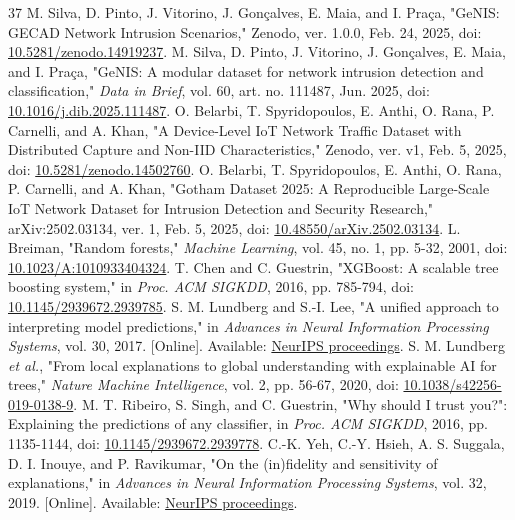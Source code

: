 \documentclass[conference,letterpaper]{IEEEtran}
\begin{document}
\begin{thebibliography}{37}
 M. Silva, D. Pinto, J. Vitorino, J. Gonçalves, E. Maia, and I. Praça, "GeNIS: GECAD Network Intrusion Scenarios," Zenodo, ver. 1.0.0, Feb. 24, 2025, doi: \href{https://doi.org/10.5281/zenodo.14919237}{10.5281/zenodo.14919237}.
 M. Silva, D. Pinto, J. Vitorino, J. Gonçalves, E. Maia, and I. Praça, "GeNIS: A modular dataset for network intrusion detection and classification," \emph{Data in Brief}, vol. 60, art. no. 111487, Jun. 2025, doi: \href{https://doi.org/10.1016/j.dib.2025.111487}{10.1016/j.dib.2025.111487}.
 O. Belarbi, T. Spyridopoulos, E. Anthi, O. Rana, P. Carnelli, and A. Khan, "A Device-Level IoT Network Traffic Dataset with Distributed Capture and Non-IID Characteristics," Zenodo, ver. v1, Feb. 5, 2025, doi: \href{https://doi.org/10.5281/zenodo.14502760}{10.5281/zenodo.14502760}.
 O. Belarbi, T. Spyridopoulos, E. Anthi, O. Rana, P. Carnelli, and A. Khan, "Gotham Dataset 2025: A Reproducible Large-Scale IoT Network Dataset for Intrusion Detection and Security Research," arXiv:2502.03134, ver. 1, Feb. 5, 2025, doi: \href{https://doi.org/10.48550/arXiv.2502.03134}{10.48550/arXiv.2502.03134}.
 L. Breiman, "Random forests," \emph{Machine Learning}, vol. 45, no. 1, pp. 5-32, 2001, doi: \href{https://doi.org/10.1023/A:1010933404324}{10.1023/A:1010933404324}.
 T. Chen and C. Guestrin, "XGBoost: A scalable tree boosting system," in \emph{Proc. ACM SIGKDD}, 2016, pp. 785-794, doi: \href{https://doi.org/10.1145/2939672.2939785}{10.1145/2939672.2939785}.
 S. M. Lundberg and S.-I. Lee, "A unified approach to interpreting model predictions," in \emph{Advances in Neural Information Processing Systems}, vol. 30, 2017. [Online]. Available: \href{https://proceedings.neurips.cc/paper/2017/hash/8a20a8621978632d76c43dfd28b67767-Abstract.html}{NeurIPS proceedings}.
 S. M. Lundberg \emph{et al.}, "From local explanations to global understanding with explainable AI for trees," \emph{Nature Machine Intelligence}, vol. 2, pp. 56-67, 2020, doi: \href{https://doi.org/10.1038/s42256-019-0138-9}{10.1038/s42256-019-0138-9}.
 M. T. Ribeiro, S. Singh, and C. Guestrin, "Why should I trust you?": Explaining the predictions of any classifier, in \emph{Proc. ACM SIGKDD}, 2016, pp. 1135-1144, doi: \href{https://doi.org/10.1145/2939672.2939778}{10.1145/2939672.2939778}.
 C.-K. Yeh, C.-Y. Hsieh, A. S. Suggala, D. I. Inouye, and P. Ravikumar, "On the (in)fidelity and sensitivity of explanations," in \emph{Advances in Neural Information Processing Systems}, vol. 32, 2019. [Online]. Available: \href{https://proceedings.neurips.cc/paper/2019/hash/a7471fdc77b3435276507cc8f2dc2569-Abstract.html}{NeurIPS proceedings}.

\end{thebibliography}
\end{document}
